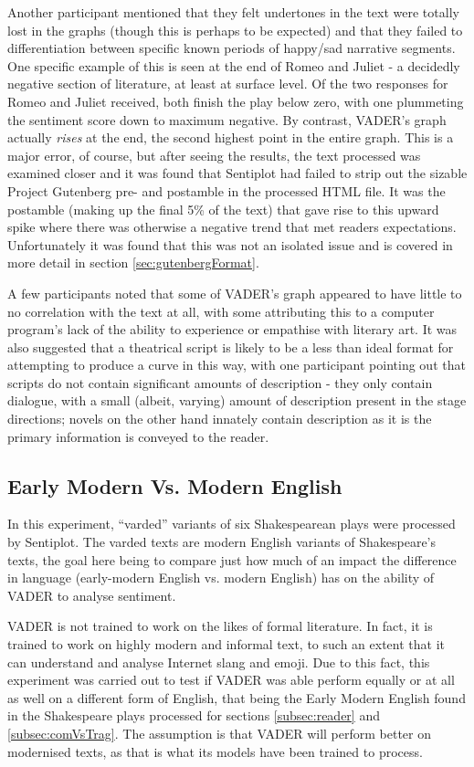 \documentclass{article}
\begin{document}
                Another participant mentioned that they felt undertones in the text were totally lost in the graphs (though this is perhaps to be expected) and that they failed to differentiation between specific known periods of happy/sad narrative segments. One specific example of this is seen at the end of Romeo and Juliet - a decidedly negative section of literature, at least at surface level. Of the two responses for Romeo and Juliet received, both finish the play below zero, with one plummeting the sentiment score down to maximum negative. By contrast, VADER's graph actually \textit{rises} at the end, the second highest point in the entire graph. This is a major error, of course, but after seeing the results, the text processed was examined closer and it was found that Sentiplot had failed to strip out the sizable Project Gutenberg pre- and postamble in the processed HTML file. It was the postamble (making up the final 5\% of the text) that gave rise to this upward spike where there was otherwise a negative trend that met readers expectations. Unfortunately it was found that this was not an isolated issue and is covered in more detail in section \ref{sec:gutenbergFormat}.
                
                A few participants noted that some of VADER's graph appeared to have little to no correlation with the text at all, with some attributing this to a computer program's lack of the ability to experience or empathise with literary art. It was also suggested that a theatrical script is likely to be a less than ideal format for attempting to produce a curve in this way, with one participant pointing out that scripts do not contain significant amounts of description - they only contain dialogue, with a small (albeit, varying) amount of description present in the stage directions; novels on the other hand innately contain description as it is the primary information is conveyed to the reader.
    \subsection{Early Modern Vs. Modern English}
        In this experiment, ``varded'' variants of six Shakespearean plays were processed by Sentiplot. The varded texts are modern English variants of Shakespeare's texts, the goal here being to compare just how much of an impact the difference in language (early-modern English vs. modern English) has on the ability of VADER to analyse sentiment.

        VADER is not trained to work on the likes of formal literature. In fact, it is trained to work on highly modern and informal text, to such an extent that it can understand and analyse Internet slang and emoji. Due to this fact, this experiment was carried out to test if VADER was able perform equally or at all as well on a different form of English, that being the Early Modern English found in the Shakespeare plays processed for sections \ref{subsec:reader} and \ref{subsec:comVsTrag}. The assumption is that VADER will perform better on modernised texts, as that is what its models have been trained to process.
        
\end{document}
